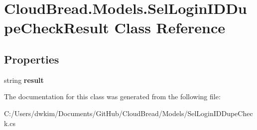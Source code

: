 \hypertarget{a00095}{}\section{Cloud\+Bread.\+Models.\+Sel\+Login\+I\+D\+Dupe\+Check\+Result Class Reference}
\label{a00095}
\subsection*{Properties}
\begin{DoxyCompactItemize}
\item 
string {\bfseries result}\hypertarget{a00095_a7b6d5bc870e338a9e7b7da1e4d93889f}{}\label{a00095_a7b6d5bc870e338a9e7b7da1e4d93889f}

\end{DoxyCompactItemize}


The documentation for this class was generated from the following file\+:\begin{DoxyCompactItemize}
\item 
C\+:/\+Users/dwkim/\+Documents/\+Git\+Hub/\+Cloud\+Bread/\+Models/Sel\+Login\+I\+D\+Dupe\+Check.\+cs\end{DoxyCompactItemize}
